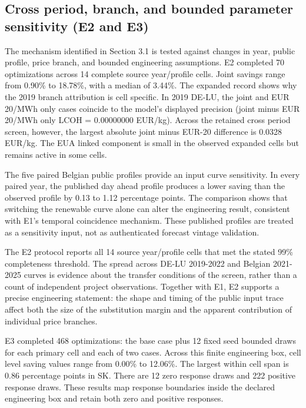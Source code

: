 \documentclass[largeformat]{interact}
\begin{document}
\subsection{Cross period, branch, and bounded parameter sensitivity (E2
and
E3)}\label{cross-period-branch-and-bounded-parameter-sensitivity-e2-and-e3}

The mechanism identified in Section 3.1 is tested against changes in
year, public profile, price branch, and bounded engineering assumptions.
E2 completed 70 optimizations across 14 complete source year/profile
cells. Joint savings range from 0.90\% to 18.78\%, with a median of
3.44\%. The expanded record shows why the 2019 branch attribution is
cell specific. In 2019 DE-LU, the joint and EUR 20/MWh only cases
coincide to the model's displayed precision (joint minus EUR 20/MWh only
LCOH = 0.00000000 EUR/kg). Across the retained cross period screen,
however, the largest absolute joint minus EUR-20 difference is 0.0328
EUR/kg. The EUA linked component is small in the observed expanded cells
but remains active in some cells.

The five paired Belgian public profiles provide an input curve
sensitivity. In every paired year, the published day ahead profile
produces a lower saving than the observed profile by 0.13 to 1.12
percentage points. The comparison shows that switching the renewable
curve alone can alter the engineering result, consistent with E1's
temporal coincidence mechanism. These published profiles are treated as
a sensitivity input, not as authenticated forecast vintage validation.




The E2 protocol reports all 14 source year/profile cells that met the
stated 99\% completeness threshold. The spread across DE-LU 2019-2022
and Belgian 2021-2025 curves is evidence about the transfer conditions
of the screen, rather than a count of independent project observations.
Together with E1, E2 supports a precise engineering statement: the shape
and timing of the public input trace affect both the size of the
substitution margin and the apparent contribution of individual price
branches.

E3 completed 468 optimizations: the base case plus 12 fixed seed bounded
draws for each primary cell and each of two cases. Across this finite
engineering box, cell level saving values range from 0.00\% to 12.06\%.
The largest within cell span is 0.86 percentage points in SK. There are
12 zero response draws and 222 positive response draws. These results
map response boundaries inside the declared engineering box and retain
both zero and positive responses.
\end{document}
